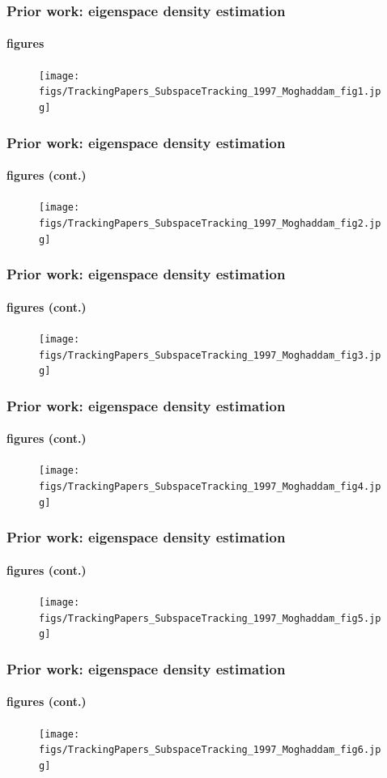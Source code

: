 \begin{frame}
\frametitle{Prior work: eigenspace density estimation}
\framesubtitle{figures}
\mypagenum
	\begin{figure}
		\texttt{[image: figs/TrackingPapers\_SubspaceTracking\_1997\_Moghaddam\_fig1.jpg]}
	\end{figure}
\end{frame}


\begin{frame}
\frametitle{Prior work: eigenspace density estimation}
\framesubtitle{figures (cont.)}
\mypagenum
	\begin{figure}
		\texttt{[image: figs/TrackingPapers\_SubspaceTracking\_1997\_Moghaddam\_fig2.jpg]}
	\end{figure}
\end{frame}


\begin{frame}
\frametitle{Prior work: eigenspace density estimation}
\framesubtitle{figures (cont.)}
\mypagenum
	\begin{figure}
		\texttt{[image: figs/TrackingPapers\_SubspaceTracking\_1997\_Moghaddam\_fig3.jpg]}
	\end{figure}
\end{frame}


\begin{frame}
\frametitle{Prior work: eigenspace density estimation}
\framesubtitle{figures (cont.)}
\mypagenum
	\begin{figure}
		\texttt{[image: figs/TrackingPapers\_SubspaceTracking\_1997\_Moghaddam\_fig4.jpg]}
	\end{figure}
\end{frame}



\begin{frame}
\frametitle{Prior work: eigenspace density estimation}
\framesubtitle{figures (cont.)}
\mypagenum
	\begin{figure}
		\texttt{[image: figs/TrackingPapers\_SubspaceTracking\_1997\_Moghaddam\_fig5.jpg]}
	\end{figure}
\end{frame}



\begin{frame}
\frametitle{Prior work: eigenspace density estimation}
\framesubtitle{figures (cont.)}
\mypagenum
	\begin{figure}
		\texttt{[image: figs/TrackingPapers\_SubspaceTracking\_1997\_Moghaddam\_fig6.jpg]}
	\end{figure}
\end{frame}




